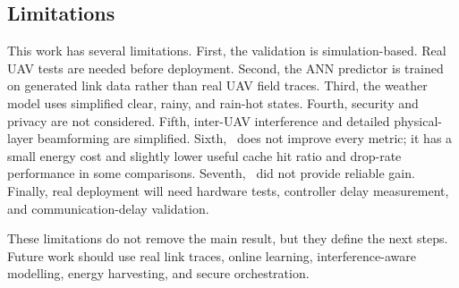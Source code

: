 \subsection{Limitations}
This work has several limitations. First, the validation is simulation-based. Real UAV tests are needed before deployment. Second, the ANN predictor is trained on generated link data rather than real UAV field traces. Third, the weather model uses simplified clear, rainy, and rain-hot states. Fourth, security and privacy are not considered. Fifth, inter-UAV interference and detailed physical-layer beamforming are simplified. Sixth, \pclr\ does not improve every metric; it has a small energy cost and slightly lower useful cache hit ratio and drop-rate performance in some comparisons. Seventh, \etp\ did not provide reliable gain. Finally, real deployment will need hardware tests, controller delay measurement, and communication-delay validation.

These limitations do not remove the main result, but they define the next steps. Future work should use real link traces, online learning, interference-aware modelling, energy harvesting, and secure orchestration.
